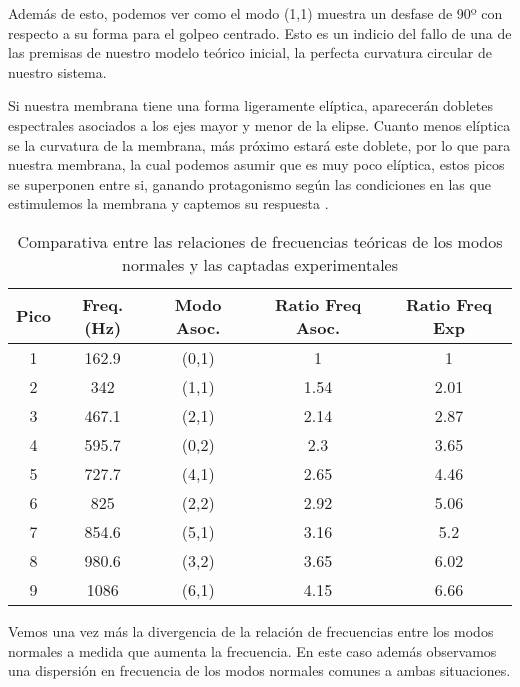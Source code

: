 \documentclass[journal, a4paper,onecolumn]{IEEEtran}
\begin{document}
Además de esto, podemos ver como el modo (1,1) muestra un desfase de 90º con respecto a su forma para el golpeo centrado. Esto es un indicio del fallo de una de las premisas de nuestro modelo teórico inicial, la perfecta curvatura circular de nuestro sistema.\newline

Si nuestra membrana tiene una forma ligeramente elíptica, aparecerán dobletes espectrales asociados a los ejes mayor y menor de la elipse. Cuanto menos elíptica se la curvatura de la membrana, más próximo estará este doblete, por lo que para nuestra membrana, la cual podemos asumir que es muy poco elíptica, estos picos se superponen entre si, ganando protagonismo según las condiciones en las que estimulemos la membrana y captemos su respuesta \cite{fisicamusical}.

 \begin{table}[H]
\centering
\begin{tabular}{c|c|c|c|c}
Pico & Freq.(Hz) & Modo Asoc. & Ratio Freq Asoc. & Ratio Freq Exp \\ \hline
1    & 162.9     & (0,1)      & 1                & 1              \\ \hline
2    & 342       & (1,1)      & 1.54             & 2.01           \\ \hline
3    & 467.1     & (2,1)      & 2.14             & 2.87           \\ \hline
4    & 595.7     & (0,2)      & 2.3              & 3.65           \\ \hline
5    & 727.7     & (4,1)      & 2.65             & 4.46           \\ \hline
6    & 825       & (2,2)      & 2.92             & 5.06           \\ \hline
7    & 854.6     & (5,1)      & 3.16             & 5.2            \\ \hline
8    & 980.6     & (3,2)      & 3.65             & 6.02           \\ \hline
9    & 1086      & (6,1)      & 4.15             & 6.66          
\end{tabular}
\caption{Comparativa entre las relaciones de frecuencias teóricas de los modos normales y las captadas experimentales}
\label{relacionfreqmodosdescentro}
\end{table}
 
 Vemos una vez más la divergencia de la relación de frecuencias entre los modos normales a medida que aumenta la frecuencia. En este caso además observamos una dispersión en frecuencia de los modos normales comunes a ambas situaciones. 
 
\end{document}

